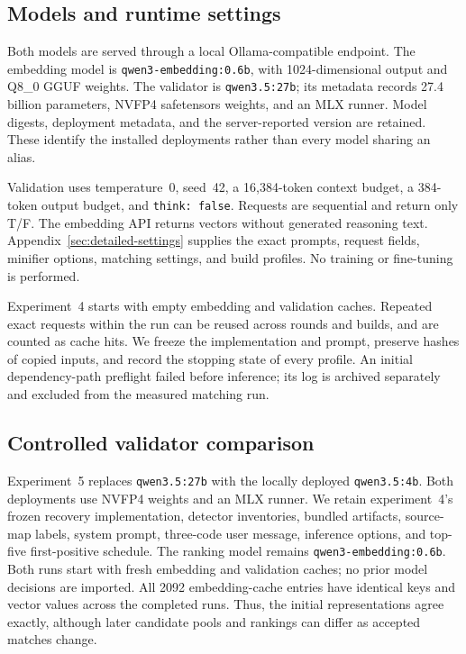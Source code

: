 \subsection{Models and runtime settings}
Both models are served through a local Ollama-compatible endpoint. The embedding model is \texttt{qwen3-embedding:0.6b}, with 1024-dimensional output and Q8\_0 GGUF weights. The validator is \texttt{qwen3.5:27b}; its metadata records 27.4 billion parameters, NVFP4 safetensors weights, and an MLX runner. Model digests, deployment metadata, and the server-reported version are retained. These identify the installed deployments rather than every model sharing an alias.

Validation uses temperature~0, seed~42, a 16,384-token context budget, a 384-token output budget, and \texttt{think: false}. Requests are sequential and return only T/F. The embedding API returns vectors without generated reasoning text. Appendix~\ref{sec:detailed-settings} supplies the exact prompts, request fields, minifier options, matching settings, and build profiles. No training or fine-tuning is performed.

Experiment~4 starts with empty embedding and validation caches. Repeated exact requests within the run can be reused across rounds and builds, and are counted as cache hits. We freeze the implementation and prompt, preserve hashes of copied inputs, and record the stopping state of every profile. An initial dependency-path preflight failed before inference; its log is archived separately and excluded from the measured matching run.

\subsection{Controlled validator comparison}
\label{sec:validator-comparison-design}
Experiment~5 replaces \texttt{qwen3.5:27b} with the locally deployed \texttt{qwen3.5:4b}. Both deployments use NVFP4 weights and an MLX runner. We retain experiment~4's frozen recovery implementation, detector inventories, bundled artifacts, source-map labels, system prompt, three-code user message, inference options, and top-five first-positive schedule. The ranking model remains \texttt{qwen3-embedding:0.6b}. Both runs start with fresh embedding and validation caches; no prior model decisions are imported. All 2092 embedding-cache entries have identical keys and vector values across the completed runs. Thus, the initial representations agree exactly, although later candidate pools and rankings can differ as accepted matches change.

